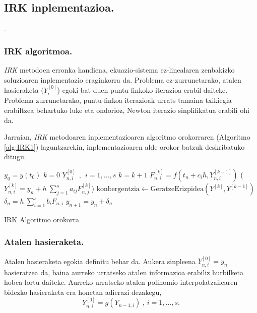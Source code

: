       
\subsection{IRK inplementazioa.}.

\subsubsection*{IRK algoritmoa.}

\emph{IRK} metodoen erronka handiena, ekuazio-sistema ez-linealaren zenbakizko soluzioaren inplementazio eraginkorra da. Problema ez-zurrunetarako, atalen hasieraketa ($Y_i^{[0]}$) egoki bat duen puntu finkoko iterazioa erabil daiteke. Problema zurrunetarako, puntu-finkoa iterazioak urrats tamaina txikiegia erabiltzea behartuko luke eta ondorioz, Newton iterazio sinplifikatua erabili ohi da.  

Jarraian, \emph{IRK} metodoaren inplementazioaren algoritmo orokorraren (Algoritmo \ref{alg:IRK1}) laguntzarekin, inplementazioaren alde orokor batzuk deskribatuko ditugu.

\begin{algorithm}[H]
 \BlankLine
  $y_0=y(t_0)$\;
 \BlankLine
  {
   \BlankLine
   $k=0$\;
     $Y_{n,i}^{[0]} \ \ , \ \ i=1,\dots,s $\;
    \BlankLine
   {
    \BlankLine
    $k=k+1$\; 
    $F_{n,i}^{[k]}=f(t_n+c_ih,Y_{n,i}^{[k-1]}) $\;
     ($Y_{n,i}^{[k]}=y_{n}+ h \ \sum\limits_{j=1}^{s} a_{ij} F_{n,j}^{[k]}$) \; 
    $\text{konbergentzia} \leftarrow \text{GeratzeErizpidea}(Y^{[k]},Y^{[k-1]}) $\; 
   }
   \BlankLine
    $\delta_n=h \ \sum\limits_{i=1}^{s} b_i F_{n,i}$\;
    $y_{n+1}=y_{n}+ \delta_n $\;
   \BlankLine
 }
 \caption{IRK Algoritmo orokorra}
 \label{alg:IRK1}
\end{algorithm}


\subsubsection*{Atalen hasieraketa.}
\label{ss:2.2.3.2}

Atalen hasieraketa egokia definitu behar da. Aukera sinpleena $Y_{n,i}^{[0]}=y_{n}$ hasieratzea da, baina aurreko urratseko atalen informazioa erabiliz hurbilketa hobea lortu daiteke. Aurreko urratseko atalen polinomio interpolatzailearen bidezko hasieraketa era honetan adierazi dezakegu,
\begin{equation*}
Y_{n,i}^{[0]}=g(Y_{n-1,i}) \ , \ i=1, \dots, s. 
\end{equation*}

